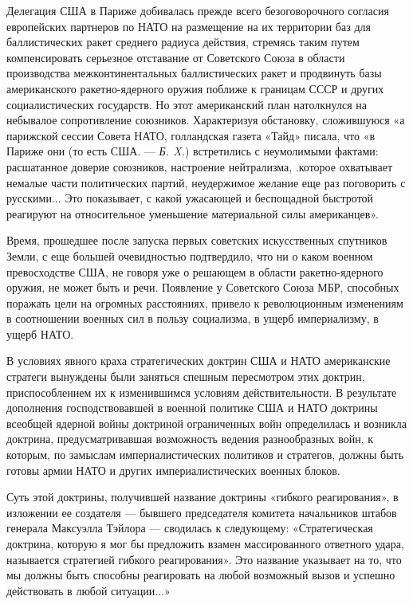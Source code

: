 \documentclass[12pt, a4paper, openany]{book}
\begin{document}
		Делегация США в Париже добивалась прежде всего безоговорочного согласия европейских партнеров по НАТО на размещение на их территории баз для баллистических ракет среднего радиуса действия, стремясь таким путем компенсировать серьезное отставание от Советского Союза в области производства межконтинентальных баллистических ракет и продвинуть базы американского ракетно-ядерного оружия поближе к границам СССР и других социалистических государств. Но этот американский план натолкнулся на небывалое сопротивление союзников. Характеризуя обстановку, сложившуюся «а парижской сессии Совета НАТО, голландская газета «Тайд» писала, что «в Париже они (то есть США. — \textit{Б. X.}) встретились с неумолимыми фактами: расшатанное доверие союзников, настроение нейтрализма, .которое охватывает немалые части политических партий, неудержимое желание еще раз поговорить с русскими... Это показывает, с какой ужасающей и беспощадной быстротой реагируют на относительное уменьшение материальной силы американцев».
		
		Время, прошедшее после запуска первых советских искусственных спутников Земли, с еще большей очевидностью подтвердило, что ни о каком военном превосходстве США, не говоря уже о решающем в области ракетно-ядерного оружия, не может быть и речи.
		Появление у Советского Союза МБР, способных поражать цели на огромных расстояниях, привело к революционным изменениям в соотношении военных сил в пользу социализма, в ущерб империализму, в ущерб НАТО.
		
		В условиях явного краха стратегических доктрин США и НАТО американские стратеги вынуждены были заняться спешным пересмотром этих доктрин, приспособлением их к изменившимся условиям действительности. В результате дополнения господствовавшей в военной политике США и НАТО доктрины всеобщей ядерной войны доктриной ограниченных войн определилась и возникла доктрина, предусматривавшая возможность ведения разнообразных войн, к которым, по замыслам империалистических политиков и стратегов, должны быть готовы армии НАТО и других империалистических военных блоков.
		
		Суть этой доктрины, получившей название доктрины «гибкого реагирования», в изложении ее создателя — бывшего председателя комитета начальников штабов генерала Максуэлла Тэйлора — сводилась к следующему: «Стратегическая доктрина, которую я мог бы предложить взамен массированного ответного удара, называется стратегией гибкого реагирования». Это название указывает на то, что мы должны быть способны реагировать на любой возможный вызов и успешно действовать в любой ситуации...»
		
\end{document}
